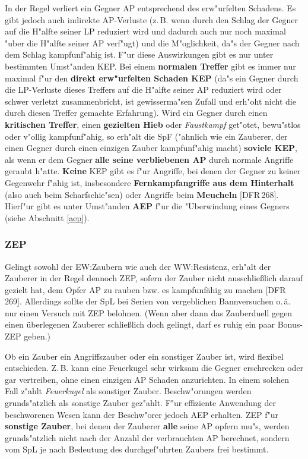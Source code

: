 \documentclass[10pt,a4paper,germanpar]{article}
\begin{document}
In der Regel verliert ein Gegner AP entsprechend des erw"urfelten
Schadens. Es gibt jedoch auch indirekte AP-Verluste (z.\,B. wenn durch
den Schlag der Gegner auf die H"alfte seiner LP reduziert wird und
dadurch auch nur noch maximal "uber die H"alfte seiner AP verf"ugt)
und die M"oglichkeit, da"s der Gegner nach dem Schlag kampfunf"ahig
ist. F"ur diese Auswirkungen gibt es nur unter bestimmten Umst"anden
KEP. Bei einem \textbf{normalen Treffer} gibt es immer nur maximal
f"ur den \textbf{direkt erw"urfelten Schaden KEP} (da"s ein Gegner
durch die LP-Verluste dieses Treffers auf die H"alfte seiner AP
reduziert wird oder schwer verletzt zusammenbricht, ist gewisserma"sen
Zufall und erh"oht nicht die durch diesen Treffer gemachte
Erfahrung). Wird ein Gegner durch einen \textbf{kritischen Treffer},
einen \textbf{gezielten Hieb} oder \emph{Faustkampf} get"otet,
bewu"stlos oder v"ollig kampfunf"ahig, so erh"alt die SpF ("ahnlich
wie ein Zauberer, der einen Gegner durch einen einzigen Zauber
kampfunf"ahig macht) \textbf{soviele KEP}, als wenn er dem Gegner
\textbf{alle seine verbliebenen AP} durch normale Angriffe geraubt
h"atte.  \textbf{Keine} KEP gibt es f"ur Angriffe, bei denen der
Gegner zu keiner Gegenwehr f"ahig ist, insbesondere
\textbf{Fernkampfangriffe aus dem Hinterhalt} (also auch beim
Scharfschie"sen) oder Angriffe beim \textbf{Meucheln}
[DFR\,268]. Hierf"ur gibt es unter Umst"anden \textbf{AEP} f"ur die
"Uberwindung eines Gegners (siehe Abschnitt \ref{aep}).

\subsubsection{ZEP} 

Gelingt sowohl der EW:Zaubern wie auch der WW:Resistenz, erh"alt der Zauberer
in der Regel dennoch ZEP, sofern der Zauber nicht ausschließlich darauf
gezielt hat, dem Opfer AP zu rauben bzw. es kampfunfähig zu machen [DFR\,269].
Allerdings sollte der SpL bei Serien von vergeblichen Bannversuchen
o.\,ä. nur einen Versuch mit ZEP belohnen. (Wenn aber dann das Zauberduell
gegen einen überlegenen Zauberer schließlich doch gelingt, darf es ruhig ein
paar Bonus-ZEP geben.)

Ob ein Zauber ein Angriffszauber oder ein sonstiger Zauber ist, wird
flexibel entschieden. Z.\,B. kann eine Feuerkugel sehr wirksam die
Gegner erschrecken oder gar vertreiben, ohne einen einzigen AP Schaden
anzurichten. In einem solchen Fall z"ahlt \emph{Feuerkugel} als
sonstiger Zauber.  Beschw"orungen werden grunds"atzlich als sonstige
Zauber gez"ahlt.  F"ur effiziente Anwendung der beschworenen Wesen
kann der Beschw"orer jedoch AEP erhalten. ZEP f"ur \textbf{sonstige
  Zauber}, bei denen der Zauberer \textbf{alle} seine AP opfern mu"s,
werden grunds"atzlich nicht nach der Anzahl der verbrauchten AP
berechnet, sondern vom SpL je nach Bedeutung des
durchgef"uhrten Zaubers frei bestimmt.
\end{document}
